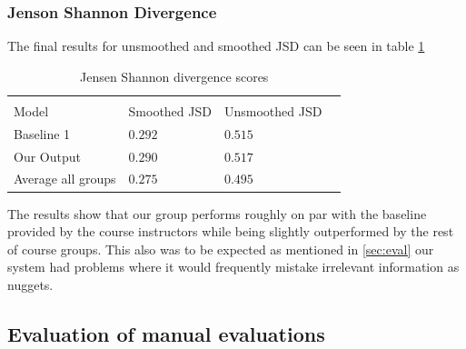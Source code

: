 \documentclass{article}
\begin{document}


\subsubsection{Jenson Shannon Divergence}
The final results for unsmoothed and smoothed JSD can be seen in table \ref{tab:jensen}

\begin{table}
	\caption{Jensen Shannon divergence scores}
	\label{tab:jensen}
	\centering
	\begin{tabular}{llll}
		\toprule
		\multicolumn{3}{c}{}                   \\
		
		Model     & Smoothed JSD & Unsmoothed JSD \\
		\midrule
		Baseline 1 & $0.292$  & $0.515$ \\
		Our Output     & $0.290$ & $0.517$    \\
		Average all groups & $0.275$& $0.495$ \\
		\bottomrule
	\end{tabular}
\end{table}

The results show that our group performs roughly on par with the baseline provided by the course instructors while being slightly outperformed by the rest of course groups. This also was to be expected as mentioned in \ref{sec:eval} our system had problems where it would frequently mistake irrelevant information as nuggets.
\subsection{Evaluation of manual evaluations}
\label{subsec:maneval}







\end{document}

